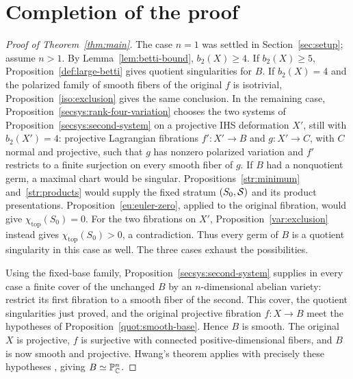 \section{Completion of the proof}\label{sec:conclusion}

\begin{proof}[Proof of Theorem~\ref{thm:main}]
The case $n=1$ was settled in Section~\ref{sec:setup}; assume $n>1$.
By Lemma~\ref{lem:betti-bound}, $b_2(X)\geq4$.
If \(b_2(X)\geq5\), Proposition~\ref{def:large-betti} gives quotient
singularities for \(B\). If \(b_2(X)=4\) and the polarized family of
smooth fibers of the original \(f\) is isotrivial,
Proposition~\ref{iso:exclusion} gives the same conclusion.
In the remaining case, Proposition~\ref{secsys:rank-four-variation}
chooses the two systems of Proposition~\ref{secsys:second-system} on a
projective IHS deformation \(X'\), still with \(b_2(X')=4\):
projective Lagrangian fibrations \(f':X'\to B\) and \(g:X'\to C\), with
\(C\) normal and projective, such that \(g\) has nonzero polarized
variation and \(f'\) restricts to a finite surjection on every smooth
fiber of \(g\).
If \(B\) had a nonquotient germ, a maximal chart would be singular.
Propositions~\ref{str:minimum} and~\ref{str:products} would supply the
fixed stratum \((S_0,\mathcal S)\) and its product presentations.
Proposition~\ref{eu:euler-zero}, applied to the original fibration,
would give \(\chi_{\mathrm{top}}(S_0)=0\).
For the two fibrations on \(X'\), Proposition~\ref{var:exclusion}
instead gives \(\chi_{\mathrm{top}}(S_0)>0\), a contradiction.
Thus every germ of \(B\) is a quotient singularity in this case as well.
The three cases exhaust the possibilities.

Using the fixed-base family, Proposition~\ref{secsys:second-system}
supplies in every case a finite cover of the unchanged \(B\) by an
\(n\)-dimensional abelian variety:
restrict its first fibration to a smooth fiber of the second.
This cover, the quotient singularities just proved, and the original
projective fibration \(f:X\to B\) meet the hypotheses of
Proposition~\ref{quot:smooth-base}. Hence \(B\) is smooth.
The original $X$ is projective, $f$ is surjective with connected
positive-dimensional fibers, and $B$ is now smooth and projective.
Hwang's theorem applies with precisely these hypotheses
\cite[Theorem~1.2, in the setting of Theorem~1.1]{Hwang2008}, giving
$B\simeq\mathbb P^n_{\mathbb C}$.
\end{proof}
